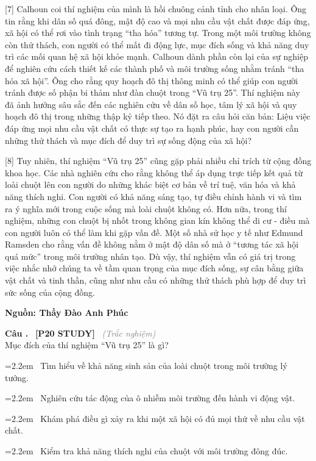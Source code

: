 \documentclass[12pt,a4paper,twoside]{article}
\newcounter{qcounter}
\newcommand{\question}[2][]{%
    \stepcounter{qcounter}%
    \par\vspace{5pt}%
    \noindent\textcolor{primaryBlue}{\textbf{Câu \theqcounter.}}~%
    \textcolor{secondaryBlue}{\small\textbf{[P20 STUDY]}}~%
    \if\relax\detokenize{#1}\relax\else\textcolor{gray}{\small\textit{(#1)}}~\fi\\[1pt]
    \noindent #2%
}
\newcommand{\choiceitem}[2]{%
    \tikz[baseline=-0.5ex]{
        \node[draw=primaryBlue, circle, minimum size=1.5em, inner sep=0pt, thick] {\textbf{#1}};
    }~#2%
}
\newenvironment{readingpassage}[1][]{%
    \begin{tcolorbox}[enhanced, colback=grayLight, colframe=secondaryBlue,
        coltitle=textDark, fonttitle=\bfseries, title={#1},
        rounded corners, arc=3mm, boxrule=1pt,
        left=15pt, right=15pt, top=10pt, bottom=10pt,
        breakable, before skip=10pt, after skip=10pt, drop fuzzy shadow]
    \setstretch{1.3}
}{\end{tcolorbox}}
\begin{document}
\begin{readingpassage}[]
[7] Calhoun coi thí nghiệm của mình là hồi chuông cảnh tỉnh cho nhân loại. Ông tin rằng khi dân số quá đông, mật độ cao và mọi nhu cầu vật chất được đáp ứng, xã hội có thể rơi vào tình trạng ``tha hóa'' tương tự. Trong một môi trường không còn thử thách, con người có thể mất đi động lực, mục đích sống và khả năng duy trì các mối quan hệ xã hội khỏe mạnh. Calhoun dành phần còn lại của sự nghiệp để nghiên cứu cách thiết kế các thành phố và môi trường sống nhằm tránh ``tha hóa xã hội''. Ông cho rằng quy hoạch đô thị thông minh có thể giúp con người tránh được số phận bi thảm như đàn chuột trong ``Vũ trụ 25''. Thí nghiệm này đã ảnh hưởng sâu sắc đến các nghiên cứu về dân số học, tâm lý xã hội và quy hoạch đô thị trong những thập kỷ tiếp theo. Nó đặt ra câu hỏi căn bản: Liệu việc đáp ứng mọi nhu cầu vật chất có thực sự tạo ra hạnh phúc, hay con người cần những thử thách và mục đích để duy trì sự sống động của xã hội?

[8] Tuy nhiên, thí nghiệm ``Vũ trụ 25'' cũng gặp phải nhiều chỉ trích từ cộng đồng khoa học. Các nhà nghiên cứu cho rằng không thể áp dụng trực tiếp kết quả từ loài chuột lên con người do những khác biệt cơ bản về trí tuệ, văn hóa và khả năng thích nghi. Con người có khả năng sáng tạo, tự điều chỉnh hành vi và tìm ra ý nghĩa mới trong cuộc sống mà loài chuột không có. Hơn nữa, trong thí nghiệm, những con chuột bị nhốt trong không gian kín không thể di cư - điều mà con người luôn có thể làm khi gặp vấn đề. Một số nhà sử học y tế như Edmund Ramsden cho rằng vấn đề không nằm ở mật độ dân số mà ở ``tương tác xã hội quá mức'' trong môi trường nhân tạo. Dù vậy, thí nghiệm vẫn có giá trị trong việc nhắc nhở chúng ta về tầm quan trọng của mục đích sống, sự cân bằng giữa vật chất và tinh thần, cũng như nhu cầu có những thử thách phù hợp để duy trì sức sống của cộng đồng.

\hfill \textbf{Nguồn: Thầy Đào Anh Phúc}
\end{readingpassage}

\setcounter{qcounter}{0}
\question[Trắc nghiệm]{Mục đích của thí nghiệm ``Vũ trụ 25'' là gì?}
\par\vspace{4pt}
\noindent\hangindent=2.2em\choiceitem{A}{Tìm hiểu về khả năng sinh sản của loài chuột trong môi trường lý tưởng.}\par\vspace{4pt}
\noindent\hangindent=2.2em\choiceitem{B}{Nghiên cứu tác động của ô nhiễm môi trường đến hành vi động vật.}\par\vspace{4pt}
\noindent\hangindent=2.2em\choiceitem{C}{Khám phá điều gì xảy ra khi một xã hội có đủ mọi thứ về nhu cầu vật chất.}\par\vspace{4pt}
\noindent\hangindent=2.2em\choiceitem{D}{Kiểm tra khả năng thích nghi của chuột với môi trường đông đúc.}\par\vspace{4pt}
\end{document}
